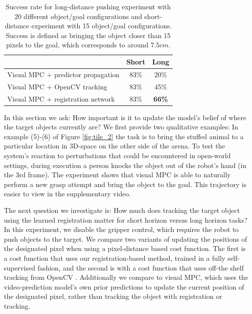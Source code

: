 \begin{table}
	{\footnotesize
		\begin{center}
			\begin{tabular}{lcc}
				\toprule
				& Short & Long \\
				\midrule
				Visual MPC $+$ predictor propagation  & 83\% & 20\% \\
				Visual MPC $+$ OpenCV tracking  & 83\%  & 45\% \\
				Visual MPC $+$ registration network & 83\% & \textbf{66\%}  \\
				\bottomrule
			\end{tabular}
		\end{center}
	}
	\caption{\small Success rate for long-distance pushing experiment with 20 different object/goal configurations and short-distance experiment with 15 object/goal configurations. Success is defined as bringing the object closer than 15 pixels to the goal, which corresponds to around $7.5cm$.}
	\label{table:res_long_short}
\end{table}
In this section we ask: How important  is it to update the model's belief of where the target objects currently are? 
We first provide two qualitative examples: In example (5)-(6) of Figure \ref{fig:tile_2} the task is to bring the stuffed animal to a particular location in 3D-space on the other side of the arena. To test the system's reaction to perturbations that could be encountered in open-world settings, during execution a person knocks the object out of the robot's hand (in the 3rd frame). The experiment shows that visual MPC is able to naturally perform a new grasp attempt and bring the object to the goal. This trajectory is easier to view in the supplementary video.


The next question we investigate is: How much does tracking the target object using the learned registration matter for short horizon versus long horizon tasks? 
In this experiment, we disable the gripper control, which requires the robot to push objects to the target. We compare two variants of updating the positions of the designated pixel when using a pixel-distance based cost function. The first is a cost function that uses our registration-based method, trained in a fully self-supervised fashion, and the second is with a cost function that uses off-the shelf tracking from OpenCV \cite{babenko2009visual}. Additionally we compare to visual MPC,
which uses the video-prediction model's own prior predictions to update the current position of the designated pixel, rather than tracking the object with registration or tracking.

